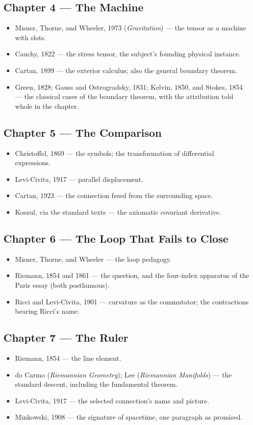\subsection*{Chapter 4 --- The Machine}
\begin{itemize}
\item Misner, Thorne, and Wheeler, 1973 (\emph{Gravitation}) --- the
tensor as a machine with slots. \item Cauchy, 1822 --- the stress tensor,
the subject's founding physical instance. \item Cartan, 1899 --- the
exterior calculus; also the general boundary theorem. \item Green, 1828;
Gauss and Ostrogradsky, 1831; Kelvin, 1850, and Stokes, 1854 --- the
classical cases of the boundary theorem, with the attribution told whole
in the chapter.
\end{itemize}

\subsection*{Chapter 5 --- The Comparison}
\begin{itemize}
\item Christoffel, 1869 --- the symbols; the transformation of
differential expressions. \item Levi-Civita, 1917 --- parallel
displacement. \item Cartan, 1923 --- the connection freed from the
surrounding space. \item Koszul, via the standard texts --- the axiomatic
covariant derivative.
\end{itemize}

\subsection*{Chapter 6 --- The Loop That Fails to Close}
\begin{itemize}
\item Misner, Thorne, and Wheeler --- the loop pedagogy. \item Riemann,
1854 and 1861 --- the question, and the four-index apparatus of the Paris
essay (both posthumous). \item Ricci and Levi-Civita, 1901 --- curvature
as the commutator; the contractions bearing Ricci's name.
\end{itemize}

\subsection*{Chapter 7 --- The Ruler}
\begin{itemize}
\item Riemann, 1854 --- the line element. \item do Carmo
(\emph{Riemannian Geometry}); Lee (\emph{Riemannian Manifolds}) --- the
standard descent, including the fundamental theorem. \item Levi-Civita,
1917 --- the selected connection's name and picture. \item Minkowski,
1908 --- the signature of spacetime, one paragraph as promised.
\end{itemize}

